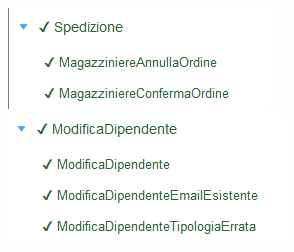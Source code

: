 \documentclass[12pt]{article}
\begin{document}
\begin{multicols}{2}
\includegraphics[scale=0.45]{spedizione} \\

\includegraphics[scale=0.45]{modificadipendente} \\

\end{multicols} 

\begin{center}



\end{center}
\end{document}
